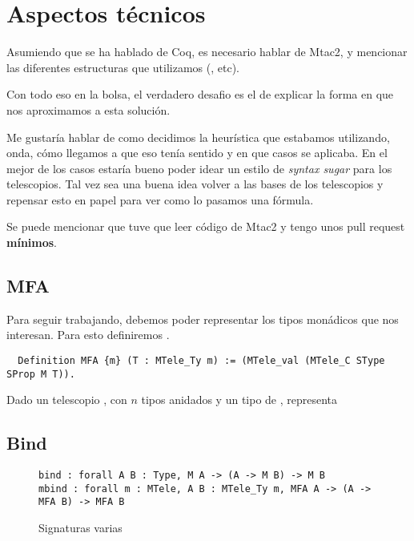 \section{Aspectos técnicos}

Asumiendo que se ha hablado de Coq, es necesario hablar de Mtac2, y mencionar
las diferentes estructuras que utilizamos (, etc).

Con todo eso en la bolsa, el verdadero desafio es el de explicar la forma en que
nos aproximamos a esta solución.


Me gustaría hablar de como decidimos la heurística que estabamos utilizando,
onda, cómo llegamos a que eso tenía sentido y en que casos se aplicaba.
En el mejor de los casos estaría bueno poder idear un estilo de \textit{syntax
  sugar} para los telescopios.
Tal vez sea una buena idea volver a las bases de los telescopios y repensar esto
en papel para ver como lo pasamos una fórmula.

Se puede mencionar que tuve que leer código de Mtac2 y tengo unos pull request
\textbf{mínimos}.

\subsection{MFA}

Para seguir trabajando, debemos poder representar los tipos monádicos que nos
interesan.
Para esto definiremos .

\begin{verbatim}
  Definition MFA {m} (T : MTele_Ty m) := (MTele_val (MTele_C SType SProp M T)).
\end{verbatim}

Dado un telescopio , con $n$ tipos anidados y un tipo  de
,  representa 


\subsection{Bind}


\begin{figure}[h]
  \centering
  \begin{verbatim}
bind : forall A B : Type, M A -> (A -> M B) -> M B
mbind : forall m : MTele, A B : MTele_Ty m, MFA A -> (A -> MFA B) -> MFA B
  \end{verbatim}
  \caption{Signaturas varias}
  \label{fig:bind}
\end{figure}

